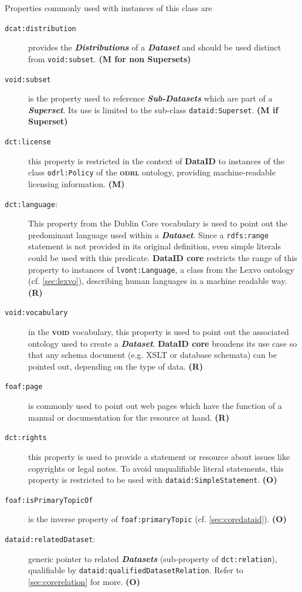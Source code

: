 \documentclass[a4paper,english,twoside,BCOR1.5cm,headsepline,DIV12,appendixprefix,final,12pt]{scrbook}
\newcommand{\dataid}{{\ttfamily\bfseries DataID}\xspace}
\newcommand{\core}{{\ttfamily\bfseries DataID core}\xspace}
\newcommand{\odrl}{{\scshape\bfseries odrl}\xspace}
\newcommand{\void}{{\scshape\bfseries void}\xspace}
\newcommand{\prop}[1]{{{\texttt{#1}}}}
\newcommand{\important}[1]{\textbf{\textit{#1}}}
\begin{document}
Properties commonly used with instances of this class are
\begin{description}
\item[\prop{dcat:distribution}] provides the \important{Distributions} of a \important{Dataset} and should be used distinct from \prop{void:subset}. \textbf{(M for non Supersets)}
\item[\prop{void:subset}] is the property used to reference \important{Sub-Datasets} which are part of a \important{Superset}. Its use is limited to 
the sub-class \prop{dataid:Superset}. \textbf{(M if Superset)}
\item[\prop{dct:license}] this property is restricted in the context of \dataid to instances of the class \prop{odrl:Policy} of the \odrl ontology, providing machine-readable licensing information. \textbf{(M)}
\item[\prop{dct:language}:] This property from the Dublin Core vocabulary is used to point out the predominant language used within a \important{Dataset}. Since a \prop{rdfs:range} statement is not provided in its original definition, even simple literals could be used with this predicate. \core restricts the range of this property to instances of  \prop{lvont:Language}, a class from the Lexvo ontology (cf. \cref{sec:lexvo}), describing human languages in a machine readable way. \textbf{(R)}
\item[\prop{void:vocabulary}] in the \void vocabulary, this property is used to point out the associated ontology used to create a \important{Dataset}. \core broadens its use case so that any schema document (e.g. XSLT or database schemata) can be pointed out, depending on the type of data. \textbf{(R)}
\item[\prop{foaf:page}] is commonly used to point out web pages which have the function of a manual or documentation for the resource at hand. \textbf{(R)}
\item[\prop{dct:rights}] this property is used to provide a statement or resource about issues like copyrights or legal notes. To avoid unqualifiable literal statements, this property is restricted to be used with \prop{dataid:SimpleStatement}. \textbf{(O)}
\item[\prop{foaf:isPrimaryTopicOf}] is the inverse property of \prop{foaf:primaryTopic} (cf. \cref{sec:coredataid}). \textbf{(O)}
\item[\prop{dataid:relatedDataset}:] generic pointer to related \important{Datasets} (sub-property of \prop{dct:relation}), qualifiable by \prop{dataid:qualifiedDatasetRelation}. Refer to \cref{sec:corerelation} for more. \textbf{(O)}

\end{description}
\end{document}
